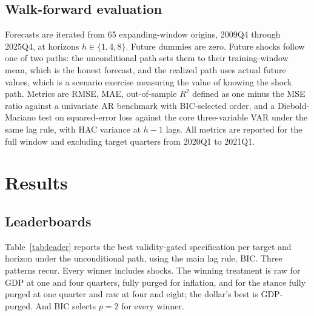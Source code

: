 \documentclass[conference]{IEEEtran}
\begin{document}
\subsection{Walk-forward evaluation}
Forecasts are iterated from 65 expanding-window origins, 2009Q4 through 2025Q4, at horizons $h \in \{1,4,8\}$. Future dummies are zero. Future shocks follow one of two paths: the unconditional path sets them to their training-window mean, which is the honest forecast, and the realized path uses actual future values, which is a scenario exercise measuring the value of knowing the shock path. Metrics are RMSE, MAE, out-of-sample $R^2$ defined as one minus the MSE ratio against a univariate AR benchmark with BIC-selected order, and a Diebold-Mariano test \cite{dm1995} on squared-error loss against the core three-variable VAR under the same lag rule, with HAC variance at $h-1$ lags. All metrics are reported for the full window and excluding target quarters from 2020Q1 to 2021Q1.

\section{Results}

\subsection{Leaderboards}
Table~\ref{tab:leader} reports the best validity-gated specification per target and horizon under the unconditional path, using the main lag rule, BIC. Three patterns recur. Every winner includes shocks. The winning treatment is raw for GDP at one and four quarters, fully purged for inflation, and for the stance fully purged at one quarter and raw at four and eight; the dollar's best is GDP-purged. And BIC selects $p=2$ for every winner.
\end{document}
